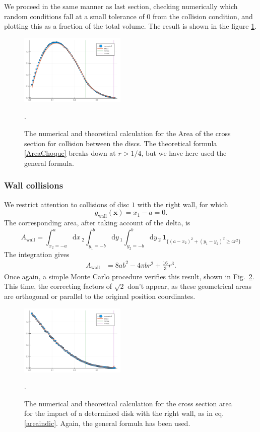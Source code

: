 \documentclass[superscriptaddress,pre,reprint,showpacs,onecolumn]{revtex4-1}
\newcommand{\rd}[1]{\mathrm{d}{#1} \,}
\newcommand{\indicatorsymbol}{\mathbf{1}}
\newcommand{\indicator}[1]{\indicatorsymbol_{ \{   #1 \} } }
\begin{document}
We proceed in the same manner as last section, checking numerically which
random
conditions fall at a small tolerance of $0$ from the collision condition, and
plotting this as a fraction of the total volume. The result is shown in the
figure \ref{AreaChoqueTeoyNum}. 
\begin{figure}
\centering
\includegraphics[width=0.45\textwidth]{./figures/AreaCol01.png}
\caption{The numerical and theoretical calculation for the Area of the cross section
for collision between the discs.  The theoretical formula 
\ref{AreaChoque} breaks down at
$r>1/4$, but we have here used the general formula.}
\label{AreaChoqueTeoyNum}.
\end{figure}


\subsubsection{Wall collisions}

We restrict attention to collisions of disc $1$ with the right wall, for which
$$g_\text{wall}(\mathbf{x}) = x_1 - a = 0.$$
The corresponding area, after taking account of the delta, is
\begin{equation}\label{areaindic}
 A_\mathrm{wall} =  \int_{x_2 = -a}^a \rd x_2 
\int_{y_1 = -b}^b \rd y_1 \int_{y_2 = -b}^b \rd y_2 \, \indicator{ (a-x_2)^2 + (y_1-y_2)^2 \ge 4 r^2 }
\end{equation}
The integration gives
\begin{align}\label{areax1p}
 A_\mathrm{wall} & = 8 a b^2-4  \pi b r^2 +\frac{16}{3}r^3 .
\end{align}
Once again, a simple Monte Carlo procedure verifies this result,
shown in Fig.~\ref{area1derecha}.
This time, the correcting factors of $\sqrt{2}$ don't appear, as
these geometrical areas are orthogonal or parallel to the original
position coordinates.


\begin{figure}
\centering
\includegraphics[width=0.45\textwidth]{./figures/AreaWall01.png}
\caption{The numerical and theoretical calculation for the cross section area
for the impact of a determined disk with the right wall, as in eq. \ref{areaindic}.
Again, the general formula has been used.}
\label{area1derecha}.
\end{figure}
\end{document}
